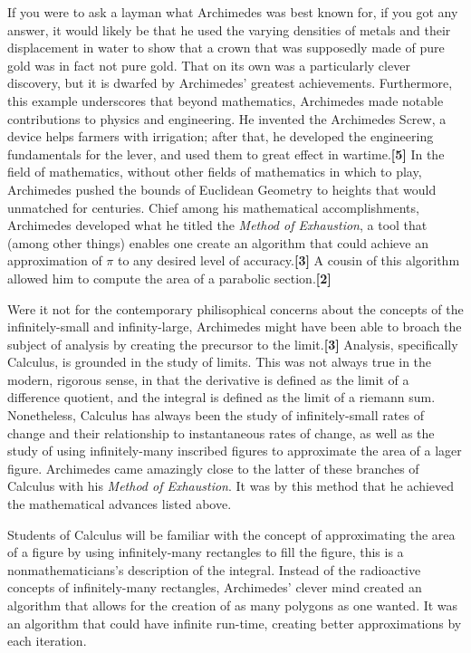 \documentclass[letterpaper, 12pt]{amsart}
\theoremstyle{definition}  %
\begin{document}
	If you were to ask a layman what Archimedes was best known for, if you got any answer, it would likely be that he used the varying densities of metals and their displacement in water to show that a crown that was supposedly made of pure gold was in fact not pure gold.
	That on its own was a particularly clever discovery, but it is dwarfed by Archimedes' greatest achievements.
	Furthermore, this example underscores that beyond mathematics, Archimedes made notable contributions to physics and engineering.
	He invented the Archimedes Screw, a device helps farmers with irrigation; after that, he developed the engineering fundamentals for the lever, and used them to great effect in wartime.\textbf{[5]}
	In the field of mathematics, without other fields of mathematics in which to play, Archimedes pushed the bounds of Euclidean Geometry to heights that would unmatched for centuries.
	Chief among his mathematical accomplishments, Archimedes developed what he titled the \textit{Method of Exhaustion}, a tool that (among other things) enables one create an algorithm that could achieve an approximation of $\pi$ to any desired level of accuracy.\textbf{[3]}
	A cousin of this algorithm allowed him to compute the area of a parabolic section.\textbf{[2]}
	
	Were it not for the contemporary philisophical concerns about the concepts of the infinitely-small and infinity-large, Archimedes might have been able to broach the subject of analysis by creating the precursor to the limit.\textbf{[3]}
	Analysis, specifically Calculus, is grounded in the study of limits.
	This was not always true in the modern, rigorous sense, in that the derivative is defined as the limit of a difference quotient, and the integral is defined as the limit of a riemann sum.
	Nonetheless, Calculus has always been the study of infinitely-small rates of change and their relationship to instantaneous rates of change, as well as the study of using infinitely-many inscribed figures to approximate the area of a lager figure.
	Archimedes came amazingly close to the latter of these branches of Calculus with his \textit{Method of Exhaustion}.
	It was by this method that he achieved the mathematical advances listed above.

	Students of Calculus will be familiar with the concept of approximating the area of a figure by using infinitely-many rectangles to fill the figure, this is a nonmathematicians's description of the integral.
	Instead of the radioactive concepts of infinitely-many rectangles, Archimedes' clever mind created an algorithm that allows for the creation of as many polygons as one wanted.
	It was an algorithm that could have infinite run-time, creating better approximations by each iteration.
\end{document}
